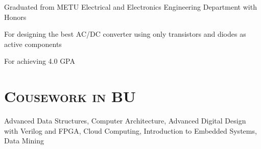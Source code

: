 \begin{resume}
	\begin{position}
		Graduated from METU Electrical and Electronics Engineering Department with
    Honors 
	\end{position}
	
	\begin{position}
		For designing the best AC/DC converter using only transistors and diodes as
    active components 
	\end{position}
	
	
	\begin{position}
		For achieving 4.0 GPA
	\end{position}
	
	
	
	
	\section{\textsc{Cousework in BU}}
	
	Advanced Data Structures, Computer Architecture, Advanced Digital Design with
	Verilog and FPGA, Cloud Computing, Introduction to Embedded Systems, Data Mining
	
	
	
	

\end{resume}
